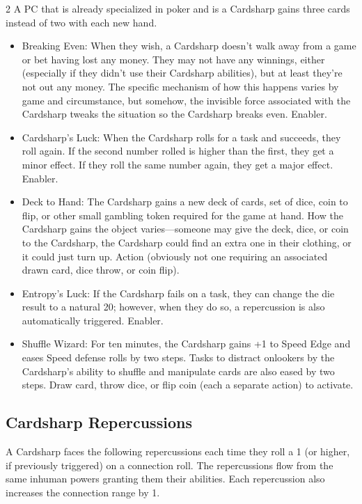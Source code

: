 \begin{multicols}{2}
A PC that is already specialized in poker and is a Cardsharp gains three cards instead of two with each new hand.

\begin{itemize}
\item Breaking Even: When they wish, a Cardsharp doesn’t walk away from a game or bet having lost any money. They may not have any winnings, either (especially if they didn’t use their Cardsharp abilities), but at least they’re not out any money. The specific mechanism of how this happens varies by game and circumstance, but somehow, the invisible force associated with the Cardsharp tweaks the situation so the Cardsharp breaks even. Enabler. 
\item Cardsharp’s Luck: When the Cardsharp rolls for a task and succeeds, they roll again. If the second number rolled is higher than the first, they get a minor effect. If they roll the same number again, they get a major effect. Enabler.
\item Deck to Hand: The Cardsharp gains a new deck of cards, set of dice, coin to flip, or other small gambling token required for the game at hand. How the Cardsharp gains the object varies—someone may give the deck, dice, or coin to the Cardsharp, the Cardsharp could find an extra one in their clothing, or it could just turn up. Action (obviously not one requiring an associated drawn card, dice throw, or coin flip). 
\item Entropy’s Luck: If the Cardsharp fails on a task, they can change the die result to a natural 20; however, when they do so, a repercussion is also automatically triggered. Enabler.
\item Shuffle Wizard: For ten minutes, the Cardsharp gains +1 to Speed Edge and eases Speed defense rolls by two steps. Tasks to distract onlookers by the Cardsharp’s ability to shuffle and manipulate cards are also eased by two steps. Draw card, throw dice, or flip coin (each a separate action) to activate. 
\end{itemize}

\subsection{Cardsharp Repercussions}

A Cardsharp faces the following repercussions each time they roll a 1 (or higher, if previously triggered) on a connection roll. The repercussions flow from the same inhuman powers granting them their abilities. Each repercussion also increases the connection range by 1.

\end{multicols}

